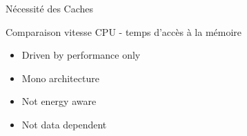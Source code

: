 %
\begin{Frame}{Nécessité des Caches}
      \begin{block}{Comparaison vitesse CPU - temps d'accès à la mémoire}
        \begin{itemize}
        \item Driven by performance only
        \item Mono architecture
        \item Not energy aware
        \item Not data dependent
        \end{itemize}
      \end{block} 
      
\end{Frame}


